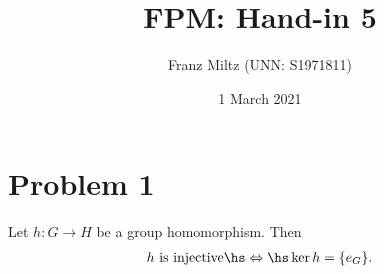\documentclass{article}
\begin{document}
\title{FPM: Hand-in 5}
\author{Franz Miltz (UNN: S1971811)}
\date{1 March 2021}
\maketitle
\mkthms

\section*{Problem 1}

\begin{claim*}
    Let $h:G\to H$ be a group homomorphism. Then
    \begin{align}
        \label{iff}
        h\text{ is injective}\hs\Leftrightarrow\hs \ker h = \{e_G\}.
    \end{align}
\end{claim*}
\end{document}
